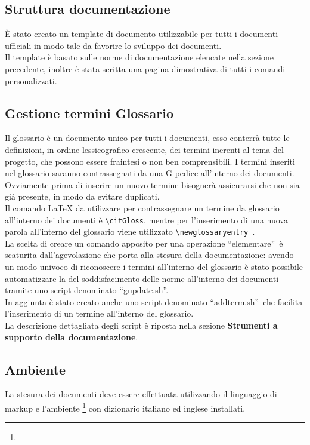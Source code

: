 \documentclass[NormeDiProgetto.tex]{subfiles}
\begin{document}
	\subsection{Struttura documentazione}
	\`{E} stato creato un template di documento utilizzabile per tutti i documenti ufficiali in modo tale da favorire lo sviluppo dei documenti.\\
	Il template è basato sulle norme di documentazione elencate nella sezione precedente, inoltre è stata scritta una pagina dimostrativa di tutti i comandi personalizzati.
	
	\subsection{Gestione termini Glossario}
	Il glossario è un documento unico per tutti i documenti, esso conterrà tutte le definizioni, in ordine lessicografico crescente, dei termini inerenti al tema del progetto, che possono essere fraintesi o non ben comprensibili. I termini inseriti nel glossario saranno contrassegnati da una G pedice all'interno dei documenti.\\
	Ovviamente prima di inserire un nuovo termine bisognerà assicurarsi che non sia già presente, in modo da evitare duplicati. \\
	Il comando \LaTeX{} da utilizzare per contrassegnare un termine da glossario all'interno dei documenti è \texttt{\textbackslash{}citGloss}, mentre per l'inserimento di una nuova parola all'interno del glossario viene utilizzato \texttt{\textbackslash{}newglossaryentry }.\\
	La scelta di creare un comando apposito per una operazione \textquotedblleft elementare\textquotedblright\ è scaturita dall'agevolazione che porta alla stesura della documentazione: avendo un modo univoco di riconoscere i termini all'interno del glossario è stato possibile automatizzare la  del soddisfacimento delle norme all'interno dei documenti tramite uno script denominato \textquotedblleft gupdate.sh\textquotedblright.\\
	In aggiunta è stato creato anche uno script denominato \textquotedblleft addterm.sh\textquotedblright\ che facilita l'inserimento di un termine all'interno del glossario.\\
	La descrizione dettagliata degli script è riposta nella sezione \textbf{Strumenti a supporto della documentazione}.
	
	
	\subsection{Ambiente}
	La stesura dei documenti deve essere effettuata utilizzando il linguaggio di markup   e l'ambiente \footnote{} con dizionario italiano ed inglese installati.
	
\end{document}
